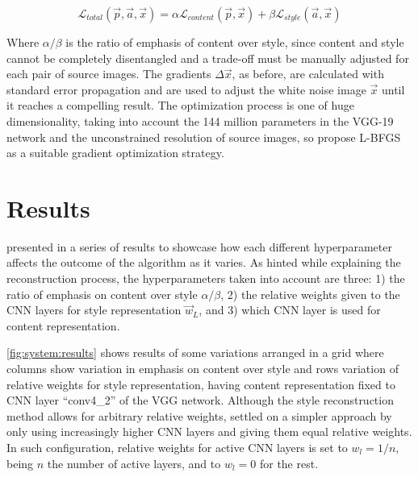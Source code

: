 \begin{equation}
  \mathcal{L}_{total}(\vec{p}, \vec{a}, \vec{x}) =
    \alpha \mathcal{L}_{content}(\vec{p}, \vec{x}) +
    \beta \mathcal{L}_{style}(\vec{a}, \vec{x})
\end{equation}

Where $\alpha/\beta$ is the ratio of emphasis of content over style, since content and style cannot be completely disentangled and a trade-off must be manually adjusted for each pair of source images.
The gradients $\Delta \vec{x}$, as before, are calculated with standard error propagation and are used to adjust the white noise image $\vec{x}$ until it reaches a compelling result.
The optimization process is one of huge dimensionality, taking into account the 144 million parameters in the VGG-19 network \cite{Simonyan2014} and the unconstrained resolution of source images, so \citeauthor{Gatys2015A} propose L-BFGS \cite{Zhu1994} as a suitable gradient optimization strategy.



\section{Results}
\label{sec:system:results}

\citeauthor{Gatys2015B} presented in \cite{Gatys2015B} a series of results to showcase how each different hyperparameter affects the outcome of the algorithm as it varies.
As hinted while explaining the reconstruction process, the hyperparameters taken into account are three: 1) the ratio of emphasis on content over style $\alpha / \beta$, 2) the relative weights given to the CNN layers for style representation $\vec{w}_L$, and 3) which CNN layer is used for content representation.

\autoref{fig:system:results} shows results of some variations arranged in a grid where columns show variation in emphasis on content over style and rows variation of relative weights for style representation, having content representation fixed to CNN layer ``conv4\_2'' of the VGG network.
Although the style reconstruction method allows for arbitrary relative weights, \citeauthor{Gatys2015B} settled on a simpler approach by only using increasingly higher CNN layers and giving them equal relative weights.
In such configuration, relative weights for active CNN layers is set to $w_l = 1/n$, being $n$ the number of active layers, and to $w_l = 0$ for the rest.

